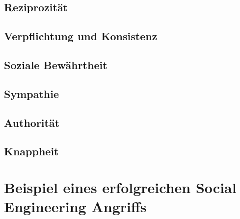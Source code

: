 \subsection{Reziprozität}
\subsection{Verpflichtung und Konsistenz}
\subsection{Soziale Bewährtheit}
\subsection{Sympathie}
\subsection{Authorität}
\subsection{Knappheit}



\section{Beispiel eines erfolgreichen Social Engineering Angriffs}
